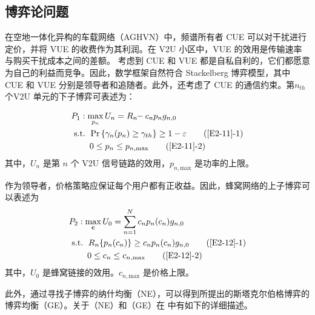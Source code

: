 \subsection{博弈论问题}\label{section2-2-2}
在空地一体化异构的车载网络（AGHVN）中，频谱所有者 CUE 可以对干扰进行定价，并将 VUE 的收费作为其利润。在 V2U 小区中，VUE 的效用是传输速率与购买干扰成本之间的差额。
考虑到 CUE 和 VUE 都是自私自利的，它们都愿意为自己的利益而竞争。因此，数学框架自然符合 Stackelberg 博弈模型，其中 CUE 和 VUE 分别是领导者和追随者。此外，还考虑了
 CUE 的通信约束。第$n_{th}$ 个V2U 单元的下子博弈可表述为：

\begin{align}
&P_1: \max\limits_{p_{n}} U_{n}=R_{n}\!\!-c_{n} p_n g_{n,0}                                                          \label{E2-11}\\
&\text { s.t. }
\quad \!\!\!\!\! \textrm{Pr}\left\{\gamma_{n}(p_n) \geq \gamma_{th}\right\}\geq1-\varepsilon  \tag{\ref{E2-11}{-1}}  \label{E2-11-1}\\
& \quad \quad \quad \!\!\!\!\! 0\leq p_n\leq p_{n,\textrm{max}}                               \tag{\ref{E2-11}{-2}}  \label{E2-11-2}
\end{align}
其中，$U_{n}$ 是第 $n$ 个 V2U 信号链路的效用，$p_{n,\textrm{max}}$ 是功率的上限。

作为领导者，价格策略应保证每个用户都有正收益。因此，蜂窝网络的上子博弈可以表述为
\begin{align}
&P_2: \max\limits_{\mathbf{c}} U_0=\sum\limits_{n=1}^N c_{n} p_n(c_{n}) g_{n,0}                    \label{E2-12}\\
& \text { s.t. }
\quad \!\!\!\!\! R_{n}\{p_n(c_{n})\} \geq c_{n} p_n(c_{n}) g_{n,0}          \tag{\ref{E2-12}{-1}}  \label{E2-12-1}\\  %
& \quad \quad \quad \!\!\!\!\! 0\leq c_n\leq c_{n,\textrm{max}}             \tag{\ref{E2-12}{-2}}  \label{E2-12-2}  %
\end{align}
其中，$U_{0}$ 是蜂窝链接的效用。$c_{n,\textrm{max}}$ 是价格上限。

此外，通过寻找子博弈的纳什均衡（NE），可以得到所提出的斯塔克尔伯格博弈的博弈均衡（GE）。关于（NE）和（GE）在 \cite{RAI}中有如下的详细描述。

